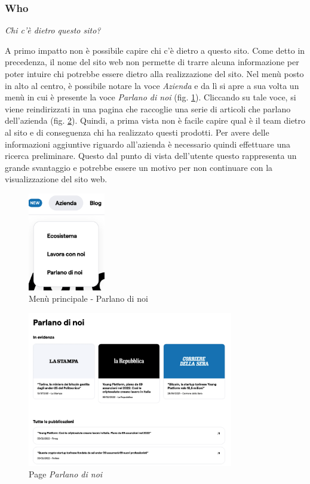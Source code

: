 \subsubsection{Who}

\centerline{\textit{Chi c'è dietro questo sito?}}
A primo impatto non è possibile capire chi c'è dietro a questo sito. Come 
detto in precedenza, il nome del sito web non permette di trarre alcuna 
informazione per poter intuire chi potrebbe essere dietro alla realizzazione 
del sito. Nel menù posto in alto al centro, è possibile notare la voce 
\textit{Azienda} e da lì si apre a sua volta un menù in cui è presente la 
voce \textit{Parlano di noi} (fig. \ref{fig:who-we-are-1}). Cliccando su tale 
voce, si viene reindirizzati in una pagina che raccoglie una serie di 
articoli che parlano dell'azienda (fig. \ref{fig:who-we-are-2}). Quindi, a 
prima vista non è facile capire qual è il team dietro al sito e di 
conseguenza chi ha realizzato questi prodotti. Per avere delle informazioni 
aggiuntive riguardo all'azienda è necessario quindi effettuare una ricerca 
preliminare. Questo dal punto di vista dell'utente questo rappresenta un 
grande svantaggio e potrebbe essere un motivo per non continuare con la 
visualizzazione del sito web. 

\begin{figure}[H]
	\centering
	\includegraphics[width=0.30\textwidth]{res/images/who-we-are-1.png}
	\caption{Menù principale - Parlano di noi}
	\label{fig:who-we-are-1}
\end{figure}

\begin{figure}[H]
	\centering
	\includegraphics[width=0.80\textwidth]{res/images/who-we-are-2.png}
	\caption{Page \textit{Parlano di noi}}
	\label{fig:who-we-are-2}
\end{figure}

